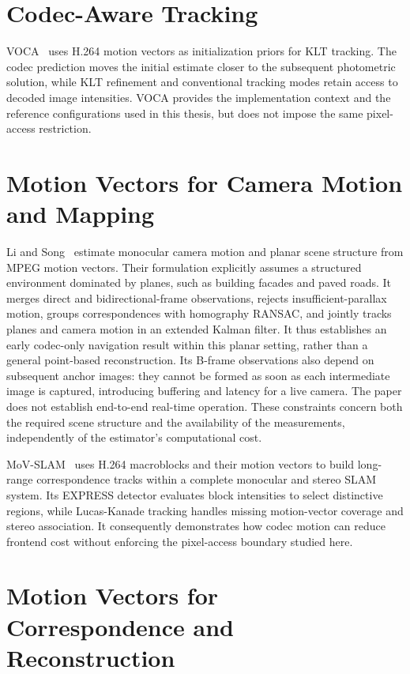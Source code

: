 \section{Codec-Aware Tracking}

VOCA~\cite{hilscher2026voca} uses H.264 motion vectors as initialization priors
for KLT tracking. The codec prediction moves the initial estimate closer to the
subsequent photometric solution, while KLT refinement and conventional tracking
modes retain access to decoded image intensities. VOCA provides the implementation
context and the reference configurations used in this thesis, but does not
impose the same pixel-access restriction.

\section{Motion Vectors for Camera Motion and Mapping}

Li and Song~\cite{li2014toward} estimate monocular camera motion and planar scene
structure from MPEG motion vectors. Their formulation explicitly assumes a
structured environment dominated by planes, such as building facades and paved
roads. It merges direct and bidirectional-frame observations, rejects
insufficient-parallax motion, groups correspondences with homography RANSAC, and
jointly tracks planes and camera motion in an extended Kalman filter. It thus
establishes an early codec-only navigation result within this planar setting,
rather than a general point-based reconstruction. Its B-frame observations also
depend on subsequent anchor images: they cannot be formed as soon as each
intermediate image is captured, introducing buffering and latency for a live
camera. The paper does not establish end-to-end real-time operation. These
constraints concern both the required scene structure and the availability of
the measurements, independently of the estimator's computational cost.

MoV-SLAM~\cite{turner2023movslam} uses H.264 macroblocks and their motion vectors to build long-range correspondence tracks within a complete monocular and stereo SLAM system. Its EXPRESS detector evaluates block intensities to select distinctive regions, while Lucas-Kanade tracking handles missing motion-vector coverage and stereo association. It consequently demonstrates how codec motion can reduce frontend cost without enforcing the pixel-access boundary studied here.

\section{Motion Vectors for Correspondence and Reconstruction}

